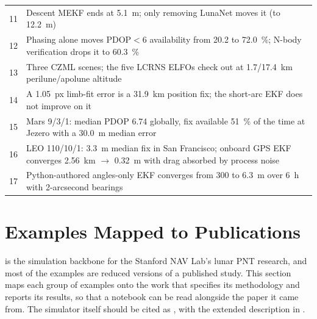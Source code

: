 \begin{table}[htbp]
\begin{tabularx}{\textwidth}{@{}r L@{}}
    11 & Descent MEKF ends at \SI{5.1}{\meter}; only removing LunaNet moves it
         (to \SI{12.2}{\meter}) \\
    12 & Phasing alone moves $\mathrm{PDOP}<6$ availability from \SI{20.2}{} to
         \SI{72.0}{\percent}; N-body verification drops it to
         \SI{60.3}{\percent} \\
    13 & Three CZML scenes; the five LCRNS ELFOs check out at
         \SI{1.7}{}/\SI{17.4}{\kilo\meter} perilune/apolune altitude \\
    14 & A \SI{1.05}{px} limb-fit error is a \SI{31.9}{\kilo\meter} position
         fix; the short-arc EKF does not improve on it \\
    15 & Mars 9/3/1: median PDOP 6.74 globally, fix available
         \SI{51}{\percent} of the time at Jezero with a \SI{30.0}{\meter}
         median error \\
    16 & LEO 110/10/1: \SI{3.3}{\meter} median fix in San Francisco; onboard GPS
         EKF converges \SI{2.56}{\kilo\meter} $\rightarrow$ \SI{0.32}{\meter}
         with drag absorbed by process noise \\
    17 & Python-authored angles-only EKF converges from \SI{300}{} to
         \SI{6.3}{\meter} over \SI{6}{\hour} with 2-arcsecond bearings \\
    \bottomrule
  \end{tabularx}
\end{table}

\section{Examples Mapped to Publications}
\label{sec:tut-publications}

\lupnt{} is the simulation backbone for the Stanford NAV Lab's lunar PNT
research, and most of the examples are reduced versions of a published study.
This section maps each group of examples onto the work that specifies its
methodology and reports its results, so that a notebook can be read alongside
the paper it came from. The simulator itself should be cited as
\citep{iiyama2023lupnt}, with the extended description in
\citep{casadesus2025lupnt}.

